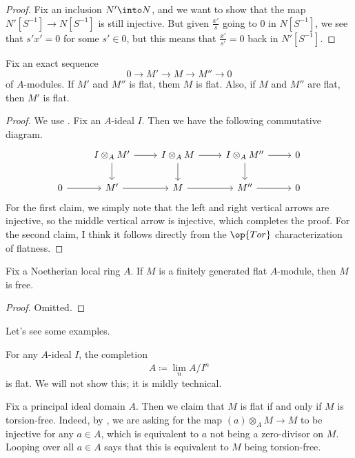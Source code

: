 \documentclass[../notes.tex]{subfiles}
\begin{document}
\begin{proof}
	Fix an inclusion $N'\into N$, and we want to show that the map $N'\left[S^{-1}\right]\to N\left[S^{-1}\right]$ is still injective. But given $\frac{x'}s$ going to $0$ in $N\left[S^{-1}\right]$, we see that $s'x'=0$ for some $s'\in 0$, but this means that $\frac{x'}{s'}=0$ back in $N'\left[S^{-1}\right]$.
\end{proof}
\begin{lemma}
	Fix an exact sequence
	\[0\to M'\to M\to M''\to0\]
	of $A$-modules. If $M'$ and $M''$ is flat, them $M$ is flat. Also, if $M$ and $M''$ are flat, then $M'$ is flat.
\end{lemma}
\begin{proof}
	We use . Fix an $A$-ideal $I$. Then we have the following commutative diagram.
	\[\begin{tikzcd}
		& {I\otimes_A M'} & {I\otimes_AM} & {I\otimes_AM''} & 0 \\
		0 & {M'} & M & {M''} & 0
		\arrow[from=2-1, to=2-2]
		\arrow[from=2-2, to=2-3]
		\arrow[from=2-3, to=2-4]
		\arrow[from=2-4, to=2-5]
		\arrow[from=1-2, to=2-2]
		\arrow[from=1-3, to=2-3]
		\arrow[from=1-4, to=2-4]
		\arrow[from=1-2, to=1-3]
		\arrow[from=1-3, to=1-4]
		\arrow[from=1-4, to=1-5]
	\end{tikzcd}\]
	For the first claim, we simply note that the left and right vertical arrows are injective, so the middle vertical arrow is injective, which completes the proof. For the second claim, I think it follows directly from the $\op{Tor}$ characterization of flatness.
\end{proof}
\begin{lemma} \label{lem:flatness-locally}
	Fix a Noetherian local ring $A$. If $M$ is a finitely generated flat $A$-module, then $M$ is free.
\end{lemma}
\begin{proof}
	Omitted.
\end{proof}
Let's see some examples.
\begin{example}
	For any $A$-ideal $I$, the completion
	\[\widehat A\coloneqq\lim_nA/I^n\]
	is flat. We will not show this; it is mildly technical.
\end{example}
\begin{example}
	Fix a principal ideal domain $A$. Then we claim that $M$ is flat if and only if $M$ is torsion-free. Indeed, by , we are asking for the map $(a)\otimes_AM\to M$ to be injective for any $a\in A$, which is equivalent to $a$ not being a zero-divisor on $M$. Looping over all $a\in A$ says that this is equivalent to $M$ being torsion-free.
\end{example}
\end{document}
